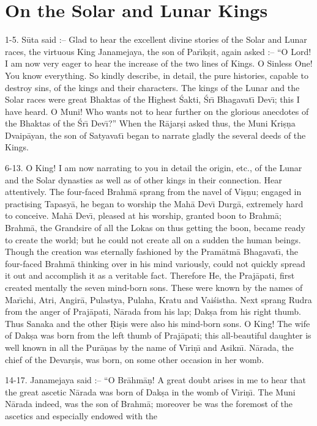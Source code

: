 \chapter{On the Solar and Lunar Kings}

1-5. S\=uta said :-- Glad to hear the excellent divine stories of the Solar and Lunar races, the virtuous King Janamejaya, the son of Par\={\i}k\d{s}it, again asked :-- ``O Lord! I am now very eager to hear the increase of the two lines of Kings. O Sinless One! You know everything. So kindly describe, in detail, the pure histories, capable to destroy sins, of the kings and their characters. The kings of the Lunar and the Solar races were great Bhaktas of the Highest \'Sakti, \'Sr\={\i} Bhagavat\={\i} Dev\={\i}; this I have heard. O Muni! Who wants not to hear further on the glorious anecdotes of the Bhaktas of the \'Sr\={\i} Dev\={\i}?'' When the R\=ajar\d{s}i asked thus, the Muni Kri\d{s}\d{n}a Dvaip\=ayan, the son of Satyavat\={\i} began to narrate gladly the several deeds of the Kings.

6-13. O King! I am now narrating to you in detail the origin, etc., of the Lunar and the Solar dynasties as well as of other kings in their connection. Hear attentively. The four-faced Brahm\=a sprang from the navel of Vi\d{s}\d{n}u; engaged in practising Tapasy\=a, he began to worship the Mah\=a Dev\={\i} Durg\=a, extremely hard to conceive. Mah\=a Dev\={\i}, pleased at his worship, granted boon to Brahm\=a; Brahm\=a, the Grandsire of all the Lokas on thus getting the boon, became ready to create the world; but he could not create all on a sudden the human beings. Though the creation was eternally fashioned by the Pram\=atm\=a Bhagavat\={\i}, the four-faced Brahm\=a thinking over in his mind variously, could not quickly spread it out and accomplish it as a veritable fact. Therefore He, the Praj\=apati, first created mentally the seven mind-born sons. These were known by the names of Mar\={\i}chi, Atri, Angir\=a, Pulastya, Pulaha, Kratu and Vai\'sistha. Next sprang Rudra from the anger of Praj\=apati, N\=arada from his lap; Dak\d{s}a from his right thumb. Thus Sanaka and the other \d{R}i\d{s}is were also his mind-born sons. O King! The wife of Dak\d{s}a was born from the left thumb of Praj\=apati; this all-beautiful daughter is well known in all the Pur\=a\d{n}as by the name of V\={\i}ri\d{n}\={\i} and Asikn\={\i}. N\=arada, the chief of the Devar\d{s}is, was born, on some other occasion in her womb.

14-17. Janamejaya said :-- ``O Br\=ahm\=a\d{n}! A great doubt arises in me to hear that the great ascetic N\=arada was born of Dak\d{s}a in the womb of V\={\i}ri\d{n}\={\i}. The Muni N\=arada indeed, was the son of Brahm\=a; moreover be was the foremost of the ascetics and especially endowed with the

